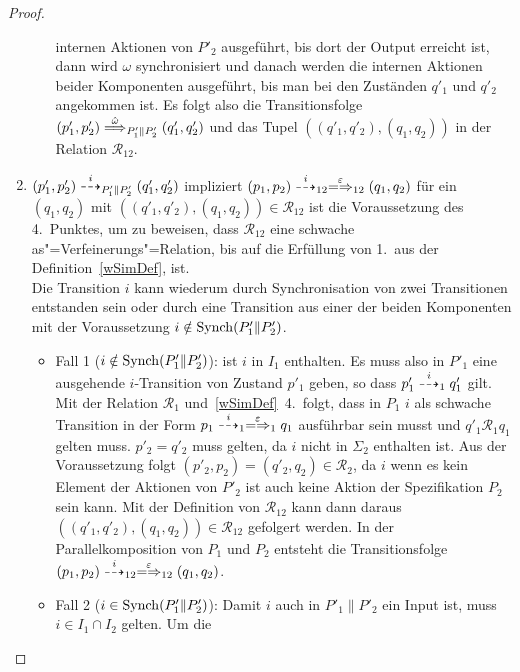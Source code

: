 \begin{proof}
\begin{enumerate}
\begin{itemize}
          internen Aktionen von $P'_2$ ausgeführt, bis dort der Output erreicht
          ist, dann wird $\omega$ synchronisiert und danach werden die internen
          Aktionen beider Komponenten ausgeführt, bis man bei den Zuständen
          $q'_1$ und $q'_2$ angekommen ist. Es folgt also die Transitionsfolge
          $(p'_1,p'_2) \weakmust[\hat{\omega}]_{P'_1\|P'_2} (q'_1,q'_2)$ und
          das Tupel $((q'_1,q'_2),(q_1,q_2))$ in der Relation
          $\mathcal{R}_{12}$.
      \end{itemize}
    \item $(p'_1,p'_2)\may[i]_{P'_1\|P'_2}(q'_1,q'_2)$ impliziert $(p_1,p_2)
      \may[i]_{12} \weakmay[\varepsilon]_{12} (q_1,q_2)$ für ein $(q_1,q_2)$
      mit $((q'_1,q'_2),(q_1,q_2))\in\mathcal{R}_{12}$ ist die Voraussetzung
      des 4.\ Punktes, um zu beweisen, dass $\mathcal{R}_{12}$ eine schwache
      as"=Verfeinerungs"=Relation, bis auf die Erfüllung von 1.\ aus der
      Definition~\ref{wSimDef}, ist.\\
      Die Transition $i$ kann wiederum durch Synchronisation von zwei
      Transitionen entstanden sein oder durch eine Transition aus einer der
      beiden Komponenten mit der Voraussetzung $i\notin\mathrm{Synch} (P'_1\|P'_2)$.
      \begin{itemize}
        \item Fall 1 ($i\notin\mathrm{Synch} (P'_1\|P'_2)$): \OBdA{} ist $i$ in $I_1$
          enthalten. Es muss also in $P'_1$ eine ausgehende $i$-Transition von
          Zustand $p'_1$ geben, so dass $p'_1\may[i]_1 q'_1$ gilt. Mit der
          Relation $\mathcal{R}_1$ und~\ref{wSimDef}~4.\ folgt, dass in $P_1$
          $i$ als schwache Transition in der Form $p_1\may[i]_1
          \weakmay[\varepsilon]_1 q_1$ ausführbar sein musst und $q'_1
          \mathcal{R}_1 q_1$ gelten muss. $p'_2=q'_2$ muss gelten, da $i$ nicht
          in $\Sigma _2$ enthalten ist. Aus der Voraussetzung folgt $(p'_2,p_2)
          =(q'_2,q_2) \in \mathcal{R}_2$, da $i$ wenn es kein Element der
          Aktionen von $P'_2$ ist auch keine Aktion der Spezifikation $P_2$
          sein kann. Mit der Definition von $\mathcal{R}_{12}$ kann dann daraus
          $((q'_1,q'_2),(q_1,q_2)) \in \mathcal{R}_{12}$ gefolgert werden. In
          der Parallelkomposition von $P_1$ und $P_2$ entsteht die
          Transitionsfolge $(p_1,p_2)\may[i]_{12} \weakmay[\varepsilon]_{12}
          (q_1,q_2)$.
        \item Fall 2 ($i\in\mathrm{Synch} (P'_1\|P'_2)$): Damit $i$ auch in
          $P'_1\|P'_2$ ein Input ist, muss $i\in I_1\cap I_2$ gelten. Um die

\end{itemize}
\end{enumerate}
\end{proof}
